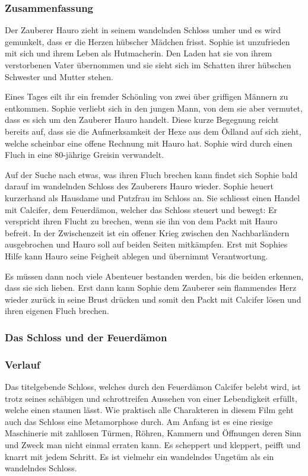 \subsubsection{Zusammenfassung}
Der Zauberer Hauro zieht in seinem wandelnden Schloss umher und es wird gemunkelt, dass er die Herzen hübscher Mädchen frisst. Sophie ist unzufrieden mit sich und ihrem Leben als Hutmacherin. Den Laden hat sie von ihrem verstorbenen Vater übernommen und sie sieht sich im Schatten ihrer hübschen Schwester und Mutter stehen. 

Eines Tages eilt ihr ein fremder Schönling von zwei über griffigen Männern zu entkommen. Sophie verliebt sich in den jungen Mann, von dem sie aber vermutet, dass es sich um den Zauberer Hauro handelt. Diese kurze Begegnung reicht bereits auf, dass sie die Aufmerksamkeit der Hexe aus dem Ödland auf sich zieht, welche scheinbar eine offene Rechnung mit Hauro hat. Sophie wird durch einen Fluch in eine 80-jährige Greisin verwandelt. 

Auf der Suche nach etwas, was ihren Fluch brechen kann findet sich Sophie bald darauf im wandelnden Schloss des Zauberers Hauro wieder. Sophie heuert kurzerhand als Hausdame und Putzfrau im Schloss an. Sie schliesst einen Handel mit Calcifer, dem Feuerdämon, welcher das Schloss steuert und bewegt: Er verspricht ihren Flucht zu brechen, wenn sie ihn von dem Packt mit Hauro befreit. In der Zwischenzeit ist ein offener Krieg zwischen den Nachbarländern ausgebrochen und Hauro soll auf beiden Seiten mitkämpfen. Erst mit Sophies Hilfe kann Hauro seine Feigheit ablegen und übernimmt Verantwortung. 

Es müssen dann noch viele Abenteuer bestanden werden, bis die beiden erkennen, dass sie sich lieben. Erst dann kann Sophie dem Zauberer sein flammendes Herz wieder zurück in seine Brust drücken und somit den Packt mit Calcifer lösen und ihren eigenen Fluch brechen. 

\subsubsection{Das Schloss und der Feuerdämon}
\subsubsection*{Verlauf}
Das titelgebende Schloss, welches durch den Feuerdämon Calcifer belebt wird, ist trotz seines schäbigen und schrottreifen Aussehen von einer Lebendigkeit erfüllt, welche einen staunen lässt. Wie praktisch alle Charakteren in diesem Film geht auch das Schloss eine Metamorphose durch. Am Anfang ist es eine riesige Maschinerie mit zahllosen Türmen, Röhren, Kammern und Öffnungen deren Sinn und Zweck man nicht einmal erraten kann. Es scheppert und kleppert, peifft und knarrt mit jedem Schritt. Es ist vielmehr ein wandelndes Ungetüm als ein wandelndes Schloss.

